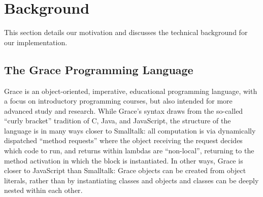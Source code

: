 
\clearpage

\section{Background}
\label{sec:background}

This section details our motivation and
discusses the technical background for our implementation.


%
%

\subsection{The Grace Programming Language}
\label{ssec:grace}



Grace is an object-oriented, imperative, educational programming
language, with a focus on introductory programming
courses, but also intended for more advanced study and research\citep{graceOnward12,graceSigcse13}.
%
While Grace's syntax draws
from the so-called ``curly bracket'' tradition of C, Java, and
JavaScript, the structure of the language
is in many ways closer to Smalltalk:
all computation is via dynamically dispatched  ``method requests''
where the object receiving the request decides which code to run,
and
%
returns within lambdas are ``non-local'', returning to the method
activation in which the block is instantiated\citep{bluebook}.  In
other ways, Grace is closer to JavaScript than Smalltalk: Grace
objects can be created from object literals, rather than by
instantiating classes\citep{Black2007-emeraldHOPL,JonesECOOP2016} and
objects and classes can be deeply nested within each 
other\citep{betabook}.

